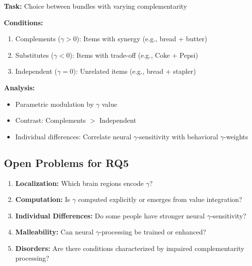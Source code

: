 \begin{tcolorbox}[colback=green!5!white,colframe=green!75!black,title=\textbf{fMRI Experiment Design}]
\textbf{Task:} Choice between bundles with varying complementarity

\textbf{Conditions:}
\begin{enumerate}[noitemsep]
    \item Complements ($\gamma > 0$): Items with synergy (e.g., bread + butter)
    \item Substitutes ($\gamma < 0$): Items with trade-off (e.g., Coke + Pepsi)
    \item Independent ($\gamma = 0$): Unrelated items (e.g., bread + stapler)
\end{enumerate}

\textbf{Analysis:}
\begin{itemize}[noitemsep]
    \item Parametric modulation by $\gamma$ value
    \item Contrast: Complements $>$ Independent
    \item Individual differences: Correlate neural $\gamma$-sensitivity with behavioral $\gamma$-weights
\end{itemize}
\end{tcolorbox}

\subsection{Open Problems for RQ5}

\begin{enumerate}
    \item \textbf{Localization:} Which brain regions encode $\gamma$?

    \item \textbf{Computation:} Is $\gamma$ computed explicitly or emerges from value integration?

    \item \textbf{Individual Differences:} Do some people have stronger neural $\gamma$-sensitivity?

    \item \textbf{Malleability:} Can neural $\gamma$-processing be trained or enhanced?

    \item \textbf{Disorders:} Are there conditions characterized by impaired complementarity processing?
\end{enumerate}

